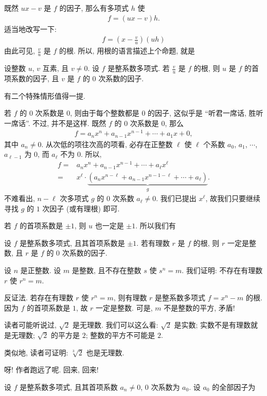 既然 $ux - v$ 是 $f$ 的因子, 那么有多项式 $h$ 使
\begin{align*}
    f = (ux - v) h.
\end{align*}
适当地改写一下:
\begin{align*}
    f = \left( x - \frac{v}{u} \right) (uh)
\end{align*}
由此可见, $\frac{v}{u}$ 是 $f$ 的根. 所以, 用根的语言描述上个命题, 就是
\begin{proposition}
    设整数 $u$, $v$ 互素, 且 $v \neq 0$. 设 $f$ 是整系数多项式. 若 $\frac{v}{u}$ 是 $f$ 的根, 则 $u$ 是 $f$ 的首项系数的因子, 且 $v$ 是 $f$ 的 $0$ 次系数的因子.
\end{proposition}

有二个特殊情形值得一提.

若 $f$ 的 $0$ 次系数是 $0$, 则由于每个整数都是 $0$ 的因子, 这似乎是 ``听君一席话, 胜听一席话''. 不过, 并不是这样. 既然 $f$ 的 $0$ 次系数是 $0$, 那么
\begin{align*}
    f = a_n x^n + a_{n-1} x^{n-1} + \cdots + a_1 x + 0,
\end{align*}
其中 $a_n \neq 0$. 从次低的项往次高的项看, 必存在正整数 $\ell$ 使 $\ell$ 个系数 $a_0$, $a_1$, $\cdots$, $a_{\ell-1}$ 为 $0$, 而 $a_{\ell}$ 不为 $0$. 所以,
\begin{align*}
    f
    = {} & a_n x^n + a_{n-1} x^{n-1} + \cdots + a_\ell x^\ell                                               \\
    = {} & x^{\ell} \cdot \underbrace{(a_n x^{n - \ell} + a_{n-1} x^{n - 1 - \ell} + \cdots + a_\ell)}_{g}.
\end{align*}
不难看出, $n - \ell$ 次多项式 $g$ 的 $0$ 次系数 $a_{\ell} \neq 0$. 我们已提出 $x^{\ell}$, 故我们只要继续寻找 $g$ 的 $1$ 次因子 (或有理根) 即可.

若 $f$ 的首项系数是 $\pm 1$, 则 $u$ 也一定是 $\pm 1$. 所以我们有
\begin{proposition}
    设 $f$ 是整系数多项式, 且其首项系数是 $\pm 1$. 若有理数 $r$ 是 $f$ 的根, 则 $r$ 一定是整数, 且 $r$ 是 $f$ 的 $0$ 次系数的因子.
\end{proposition}

\begin{example}
    设 $n$ 是正整数. 设 $m$ 是整数, 且不存在整数 $s$ 使 $s^n = m$. 我们证明: 不存在有理数 $r$ 使 $r^n = m$.

    反证法. 若存在有理数 $r$ 使 $r^n = m$, 则有理数 $r$ 是整系数多项式 $f = x^n - m$ 的根. 因为 $f$ 的首项系数是 $1$, 故 $r$ 一定是整数. 可是, $m$ 不是整数的平方, 矛盾!

    读者可能听说过, $\sqrt{2}$ 是无理数. 我们可以这么看: $\sqrt{2}$ 是实数; 实数不是有理数就是无理数; $\sqrt{2}$ 的平方是 $2$; 整数的平方不可能是 $2$.

    类似地, 读者可证明: $\sqrt[3]{2}$ 也是无理数.
\end{example}

呀! 作者跑远了呢. 回来, 回来!

设 $f$ 是整系数多项式, 且其首项系数 $a_n \neq 0$, $0$ 次系数为 $a_0$. 设 $a_0$ 的全部因子为
